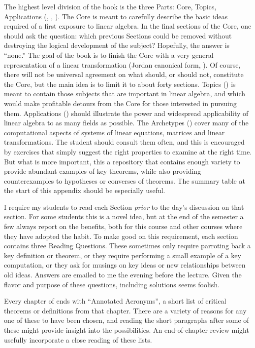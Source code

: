 The highest level division of the book is the three Parts:  Core, Topics, Applications (, , ).  The Core is meant to carefully describe the basic ideas required of a first exposure to linear algebra.  In the final sections of the Core, one should ask the question:  which previous Sections could be removed without destroying the logical development of the subject?  Hopefully, the answer is ``none.''  The goal of the book is to finish the Core with a very general representation of a linear transformation (Jordan canonical form, ).  Of course, there will not be universal agreement on what should, or should not, constitute the Core, but the main idea is to limit it to about forty sections.  Topics () is meant to contain those subjects that are important in linear algebra, and which would make profitable detours from the Core for those interested in pursuing them.  Applications () should illustrate the power and widespread applicability of linear algebra to as many fields as possible.
%
The Archetypes () cover many of the computational aspects of systems of linear equations, matrices and linear transformations.  The student should consult them often, and this is encouraged by exercises that simply suggest the right properties to examine at the right time.  But what is more important, this a repository that contains enough variety to provide abundant examples of key theorems, while also providing counterexamples to hypotheses or converses of theorems.  The summary table at the start of this appendix should be especially useful.\par
%
I require my students to read each Section {\em prior} to the day's discussion on that section.  For some students this is a novel idea, but at the end of the semester a few always report on the benefits, both for this course and other courses where they have adopted the habit.  To make good on this requirement, each section contains three Reading Questions.  These sometimes only require parroting back a key definition or theorem, or they require performing a small example of a key computation, or they ask for musings on key ideas or new relationships between old ideas.  Answers are emailed to me the evening before the lecture.  Given the flavor and purpose of these questions, including solutions seems foolish.\par
%
Every chapter of  ends with ``Annotated Acronyms'', a short list of critical theorems or definitions from that chapter.  There are a variety of reasons for any one of these to have been chosen, and reading the short paragraphs after some of these might provide insight into the possibilities.  An end-of-chapter review might usefully incorporate a close reading of these lists.\par
